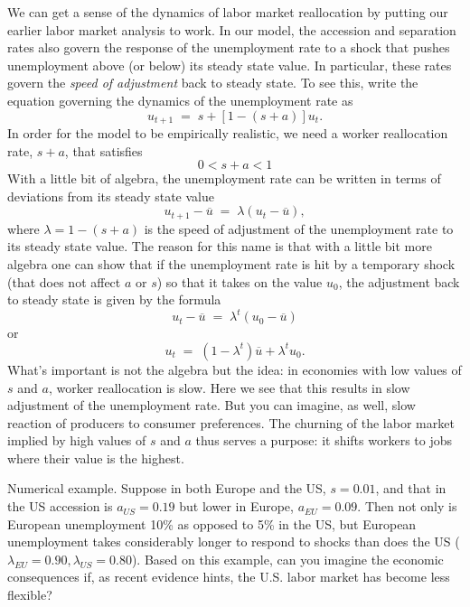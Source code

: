 \documentclass[letterpaper,12pt]{article}
\begin{document}
We can get a sense of the dynamics of labor market reallocation
 by putting our earlier labor market analysis to work.
In our model, the accession and separation rates also govern the response of the unemployment rate to a shock that pushes unemployment above (or below) its steady state value. In particular, these rates govern the {\it speed of adjustment} back to steady state. To see this, write the equation governing the dynamics of the unemployment rate as
\[
    u_{t+1} \;=\; s+ [1-(s+a)] u_{t} .
\]
In order for the model to be empirically realistic, we need a worker reallocation rate, $s+a$, that satisfies
\[0<s+a<1\]
With a little bit of algebra, the unemployment rate can be written in terms of deviations from its steady state value
\[
    u_{t+1}-\overline{u} \;=\; \lambda (u_t-\overline{u}) ,
\]
where $\lambda=1-(s+a)$ is the speed of adjustment of the unemployment rate to its steady state value. The reason for this name is that with a little bit more algebra one can show that if the unemployment rate is hit by a temporary shock (that does not affect $a$ or $s$) so that it takes on the value $u_0$, the adjustment back to steady state is given by the formula
\[
    u_t-\overline{u} \;=\; \lambda^{t}(u_0-\overline{u})
\]
or
\[
    u_t \;=\; (1-\lambda^{t})\overline{u}+\lambda^{t}u_0 .
\]
What's important is not the algebra but the idea:
in economies with low values of $s$ and $a$,
worker reallocation is slow.
Here we see that this results in slow adjustment of the unemployment rate.
But you can imagine, as well, slow reaction of producers to consumer
preferences.
The churning of the labor market implied by high values of $s$ and $a$
thus serves a purpose:  it shifts workers to jobs where their value is the highest.



\begin{comment}
Notice that a high separation rate $s$ has two important effects on the economy: it (i)~raises the steady state unemployment rate, but (ii) helps the economy respond quickly to temporary shocks to unemployment. On the other hand, a high accession rate $a$ has two unambiguously good effects: it (i) reduces the steady state unemployment rate, and (ii) helps the economy respond quickly to temporary shocks. This suggests that one way to think about the European unemployment problem is as an economy with an $s$ that is moderate and an $a$ that is low.
\end{comment}

Numerical example.
Suppose in both Europe and the US, $s=0.01$, and that in the US accession is $a_{US}=0.19$ but lower in Europe, $a_{EU}=0.09$. Then not only is European unemployment 10\% as opposed to 5\% in the US, but European unemployment takes considerably longer to respond to shocks than does the US ($\lambda_{EU}=0.90,\lambda_{US}=0.80$). Based on this example, can you imagine the economic consequences if, as recent evidence hints, the U.S. labor market has become less flexible?
\end{document}
